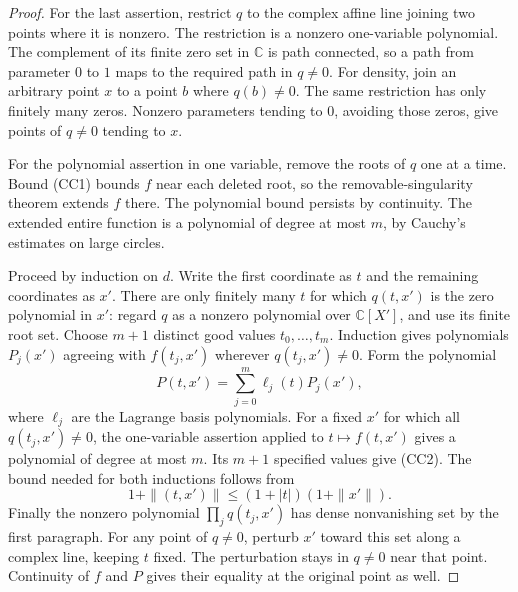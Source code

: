 \begin{proof}
For the last assertion, restrict \(q\) to the complex affine
line joining two points where it is nonzero.
The restriction is a nonzero one-variable polynomial.
The complement of its finite zero set in \(\mathbb C\)
is path connected, so a path from parameter \(0\) to \(1\)
maps to the required path in \(q\ne0\).
For density, join an arbitrary point \(x\) to a point \(b\)
where \(q(b)\ne0\).
The same restriction has only finitely many zeros.
Nonzero parameters tending to \(0\), avoiding those zeros,
give points of \(q\ne0\) tending to \(x\).

For the polynomial assertion in one variable, remove the
roots of \(q\) one at a time.
Bound (CC1) bounds \(f\) near each deleted root, so the
removable-singularity theorem extends \(f\) there.
The polynomial bound persists by continuity.
The extended entire function is a polynomial of degree at
most \(m\), by Cauchy's estimates on large circles.

Proceed by induction on \(d\).
Write the first coordinate as \(t\) and the remaining
coordinates as \(x'\).
There are only finitely many \(t\) for which \(q(t,x')\)
is the zero polynomial in \(x'\): regard \(q\) as a nonzero
polynomial over \(\mathbb C[X']\), and use its finite root set.
Choose \(m+1\) distinct good values \(t_0,\ldots,t_m\).
Induction gives polynomials \(P_j(x')\) agreeing with
\(f(t_j,x')\) wherever \(q(t_j,x')\ne0\).
Form the polynomial
\[
                 P(t,x')=\sum_{j=0}^m
                       \ell_j(t)P_j(x'),                    \tag{CC2}
\]
where \(\ell_j\) are the Lagrange basis polynomials.
For a fixed \(x'\) for which all \(q(t_j,x')\ne0\), the
one-variable assertion applied to \(t\mapsto f(t,x')\)
gives a polynomial of degree at most \(m\).
Its \(m+1\) specified values give (CC2).
The bound needed for both inductions follows from
\[
       1+\|(t,x')\|\le(1+|t|)(1+\|x'\|).
\]
Finally the nonzero polynomial \(\prod_jq(t_j,x')\)
has dense nonvanishing set by the first paragraph.
For any point of \(q\ne0\), perturb \(x'\) toward this set
along a complex line, keeping \(t\) fixed.
The perturbation stays in \(q\ne0\) near that point.
Continuity of \(f\) and \(P\) gives their equality at the
original point as well.
\end{proof}

